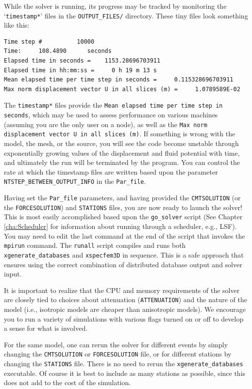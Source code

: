 While the solver is running, its progress may be tracked by monitoring
the `\texttt{\small timestamp{*}}' files in the \texttt{\small OUTPUT\_FILES/} directory. These tiny
files look something like this:
{\small
\begin{verbatim}
Time step #          10000
Time:     108.4890      seconds
Elapsed time in seconds =    1153.28696703911
Elapsed time in hh:mm:ss =     0 h 19 m 13 s
Mean elapsed time per time step in seconds =     0.115328696703911
Max norm displacement vector U in all slices (m) =     1.0789589E-02
\end{verbatim}
}
The \texttt{\small timestamp{*}} files provide the
\texttt{\small Mean elapsed time per time step in seconds}, which may be used
to assess performance on various machines (assuming you are the only
user on a node), as well as the
\texttt{\small Max norm displacement vector U in all slices~(m)}.
If something is wrong with the
model, the mesh, or the source, you will see the code become unstable
through exponentially growing values of the displacement and fluid
potential with time, and ultimately the run will be terminated by
the program. You can control the rate at which the timestamp files
are written based upon the parameter
\texttt{\small NTSTEP\_BETWEEN\_OUTPUT\_INFO}
in the \texttt{\small Par\_file}.

Having set the \texttt{Par\_file} parameters, and having provided
the \texttt{CMTSOLUTION} (or the \texttt{FORCESOLUTION}) and \texttt{STATIONS}
files, you are now ready to launch the solver! This is most easily
accomplished based upon the \texttt{go\_solver} script (See Chapter
\ref{cha:Scheduler} for information about running through a scheduler,
e.g., LSF). You may need to edit the last command at the end of the
script that invokes the \texttt{mpirun} command. The \texttt{runall}
script compiles and runs both \texttt{xgenerate\_databases} and \texttt{xspecfem3D}
in sequence. This is a safe approach that ensures using the correct
combination of distributed database output and solver input.

It is important to realize that the CPU and memory requirements of
the solver are closely tied to choices about attenuation (\texttt{ATTENUATION})
and the nature of the model (i.e., isotropic models are cheaper than
anisotropic models). We encourage you to run a variety of simulations
with various flags turned on or off to develop a sense for what is
involved.

For the same model, one can rerun the solver for different events
by simply changing the \texttt{CMTSOLUTION} or \texttt{FORCESOLUTION}
file, or for different stations by changing the \texttt{STATIONS}
file. There is no need to rerun the \texttt{xgenerate\_databases}
executable. Of course it is best to include as many stations as possible,
since this does not add to the cost of the simulation.

